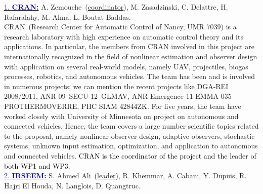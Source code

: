\documentclass[a4paper,11pt]{article}
\begin{document}
\underline{\textcolor{blue}{1. \bf CRAN:}} {\small A. Zemouche~(\underline{coordinator}), M. Zasadzinski, C. Delattre, H. Rafaralahy, M. Alma, L. Boutat-Baddas}. \\
%
CRAN~(Research Center for Automatic Control of Nancy, UMR 7039) is a research laboratory with high experience on automatic control theory and its applications. In particular, the members from CRAN involved in this project are internationally recognized in  the field of nonlinear estimation and observer design with application on several real-world models, namely UAV, projectiles, biogas processes, robotics, and autonomous vehicles. The team has been and is involved in numerous projects; we can mention the recent projects like {DGA-REI 2008/2011}, {ANR-09--SECU-12--GLMAV}, ANR Emergence-11-EMMA-035 PROTHERMOVERRE, {PHC SIAM 42844ZK}. For five years, the team have worked closely with University of Minnesota on project on autonomous and connected vehicles. Hence, the team covers a large number scientific topics related to the proposal, namely nonlinear observer design, adaptive observers, stochastic systems, unknown input estimation, optimization, and application to autonomous and connected vehicles. \textcolor{black}{CRAN is the coordinator of the project and the leader of both WP1 and WP3}.\\
%
\underline{\textcolor{blue}{2. \bf IRSEEM:}} {\small S. Ahmed Ali~(\underline{leader}), R. Khemmar, A. Cabani, Y. Dupuis, R. Hajri El Houda, N. Langlois, D. Quangtruc}.\\
%
\end{document}
